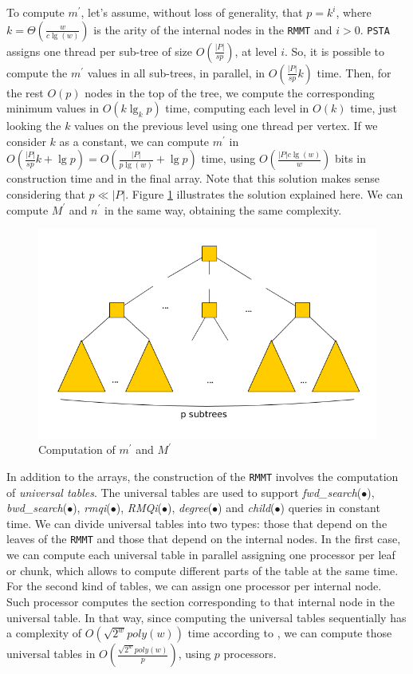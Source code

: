 To compute $m^{\prime}$, let's assume, without loss of generality,
that $p = k^{i}$, where $k = \Theta(\frac{w}{c\lg(w)})$ is the arity
of the internal nodes in the {\tt RMMT} and $i > 0$. {\tt PSTA}
assigns one thread per sub-tree of size $O(\frac{|P|}{sp})$, at level
$i$. So, it is possible to compute the $m^{\prime}$ values in all
sub-trees, in parallel, in $O(\frac{|P|}{sp}k)$ time. Then, for the
rest $O(p)$ nodes in the top of the tree, we compute the corresponding
minimum values in $O(k\lg_{k} p)$ time, computing each level in $O(k)$
time, just looking the $k$ values on the previous level using one
thread per vertex. If we consider $k$ as a constant, we can compute
$m^{\prime}$ in
$O(\frac{|P|}{sp}k + \lg p) = O(\frac{|P|}{p\lg(w)}+\lg p)$ time,
using $O(\frac{|P|c\lg(w)}{w})$ bits in construction time and in the
final array. Note that this solution makes sense considering that
$p\ll |P|$. Figure \ref{fig:min-max-array} illustrates the solution
explained here. We can compute $M^{\prime}$ and $n^{\prime}$ in the
same way, obtaining the same complexity.

\begin{figure}[ht]
  \centering
  \includegraphics[scale=0.28]{./images/Min-Max-array.png}
  \caption{Computation of $m^{\prime}$ and $M^{\prime}$}
  \label{fig:min-max-array} 
\end{figure}

In addition to the arrays, the construction of the {\tt RMMT} involves
the computation of \emph{universal tables}. The universal tables are
used to support \emph{fwd\_search}($\bullet$),
\emph{bwd\_search}($\bullet$), \emph{rmqi}($\bullet$),
\emph{RMQi}($\bullet$), \emph{degree}($\bullet$) and
\emph{child}($\bullet$) queries in constant time. We can divide
universal tables into two types: those that depend on the leaves of
the {\tt RMMT} and those that depend on the internal nodes. In the
first case, we can compute each universal table in parallel assigning
one processor per leaf or chunk, which allows to compute different
parts of the table at the same time. For the second kind of tables, we
can assign one processor per internal node. Such processor computes
the section corresponding to that internal node in the universal
table. In that way, since computing the universal tables sequentially
has a complexity of $O(\sqrt{2^{w}}poly(w))$ time according to
\cite{Navarro:2014:FFS:2620785.2601073}, we can compute those
universal tables in $\displaystyle O(\frac{\sqrt{2^{w}}poly(w)}{p})$,
using $p$ processors.

